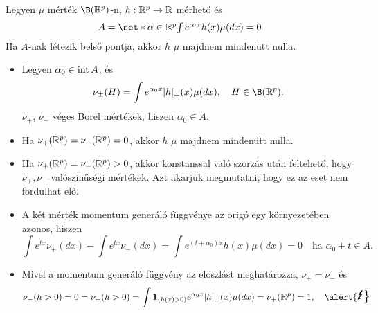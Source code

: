 \documentclass[aspectratio=169,notheorems,9pt,\option]{beamer}
\begin{document}
  \begin{frame}%
    \begin{theorem}
      Legyen $\mu$ mérték $\B (\real^p)$-n, $h:\mathbb{R}^p\to\mathbb{R}$ mérhető és 
      \begin{displaymath}\textstyle
        A=\set*{\alpha\in\real^p}{\int e^{\alpha \cdot x}h (x)\mu
          (dx)=0}%
      \end{displaymath}
      Ha $A$-nak létezik belső pontja, akkor $h$ $\mu$ majdnem mindenütt nulla.
    \end{theorem}
    \begin{itemize}
    \item Legyen $\alpha_0\in\operatorname{int} A$, és
      \begin{displaymath}
        \nu_{\pm} (H)=\int e^{\alpha_0x}\abs*{h}_\pm (x) \mu (d x),\quad H\in\B(\real^p).
      \end{displaymath}
      $\nu_{+}$, $\nu_{-}$ véges Borel mértékek,  hiszen $\alpha_0\in A$.
    \item  Ha $\nu_{+} (\mathbb{R}^p)=\nu_{-} (\mathbb{R}^p) = 0$, akkor $h$ $\mu$ majdnem mindenütt
      nulla.
    \item Ha $\nu_{+}(\mathbb{R}^p)=\nu_{-} (\mathbb{R}^p)>0$, akkor konstanssal
      való szorzás után feltehető, hogy $\nu_{+},\nu_{-}$ valószínűségi
      mértékek. Azt akarjuk megmutatni, hogy ez az eset nem fordulhat
      elő. 
      
    \item A két mérték momentum generáló függvénye az origó egy
      környezetében azonos, hiszen
      \begin{displaymath}
        \int e^{t x}\nu_{+} (d x)-\int e^{t x}\nu_{-} (d x)=\int
        e^{(t+\alpha_0)x}h (x)\mu (d x)=0
            \quad\text{ha $\alpha_0+t\in A$.}
      \end{displaymath}
    \item Mivel a momentum generáló függvény az eloszlást meghatározza,
      $\nu_{+}=\nu_{-}$ és %
      \begin{displaymath}
        \nu_{-} (h>0)=0=\nu_{+}(h>0)=
        \int \I{h (x) >0} e^{\alpha_0 x}\abs*{h}_+ (x)\mu (d x)=
        \nu_{+} (\real^p)=1,
        \quad\text{\alert{\Large\Lightning}}
      \end{displaymath}
    \end{itemize}
  \end{frame}
  
\end{document}
